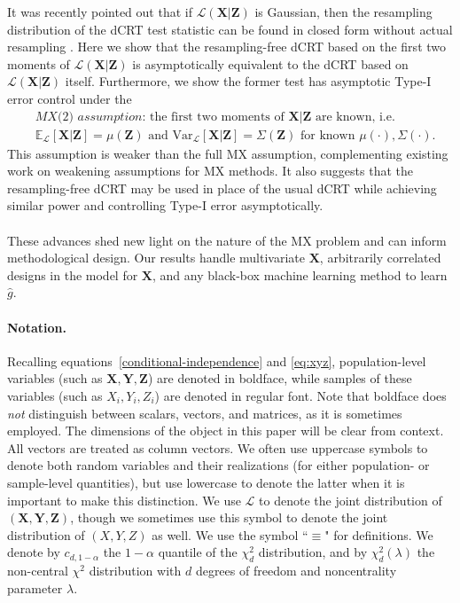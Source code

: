 \documentclass[ejs]{imsart}
\numberwithin{equation}{section}
\theoremstyle{plain}
\theoremstyle{definition}
\theoremstyle{remark}
\newcommand{\prx}{\bm X}
\newcommand{\srx}{X}
\newcommand{\prz}{\bm Z}
\newcommand{\srz}{Z}
\newcommand{\pry}{{\bm Y}}
\newcommand{\sry}{Y}
\begin{document}
It was recently pointed out that if $\mathcal L(\prx|\prz)$ is Gaussian, then the resampling distribution of the dCRT test statistic can be found in closed form without actual resampling \citep{Liu2020}. Here we show that the resampling-free dCRT based on the first two moments of $\mathcal L(\prx|\prz)$ is asymptotically equivalent to the dCRT based on $\mathcal L(\prx|\prz)$ itself. Furthermore, we show the former test has asymptotic Type-I error control under the
\begin{equation}
	\begin{split}
		&\textit{MX(2) assumption:} \text{ the first two moments of $\prx|\prz$ are known, i.e.} \\
		&\mathbb E_{\mathcal L}[\prx|\prz] = \mu(\prz) \text{ and } \text{Var}_{\mathcal L}[\prx|\prz] = \Sigma(\prz) \text{ for known } \mu(\cdot), \Sigma(\cdot).
		\label{MX(2)-intro}
	\end{split}
\end{equation}
This assumption is weaker than the full MX assumption, complementing existing work \citep{Huang2019, Barber2020} on weakening assumptions for MX methods. It also suggests that the resampling-free dCRT may be used in place of the usual dCRT while achieving similar power and controlling Type-I error asymptotically.

\paragraph*{}

These advances shed new light on the nature of the MX problem and can inform methodological design. Our results handle multivariate $\prx$, arbitrarily correlated designs in the model for $\prx$, and any black-box machine learning method to learn $\widehat g$. 
\paragraph{Notation.}

Recalling equations~\eqref{conditional-independence} and \eqref{eq:xyz}, population-level variables (such as $\prx,\pry,\prz$) are denoted in boldface, while samples of these variables (such as $\srx_i,\sry_i,\srz_i$) are denoted in regular font. Note that boldface does \textit{not} distinguish between scalars, vectors, and matrices, as it is sometimes employed. The dimensions of the object in this paper will be clear from context. All vectors are treated as column vectors. We often use uppercase symbols to denote both random variables and their realizations (for either population- or sample-level quantities), but use lowercase to denote the latter when it is important to make this distinction. We use $\mathcal L$ to denote the joint distribution of $(\prx,\pry,\prz)$, though we sometimes use this symbol to denote the joint distribution of $(\srx,\sry,\srz)$ as well. We use the symbol ``$\equiv$" for definitions. We denote by $c_{d,1-\alpha}$ the $1-\alpha$ quantile of the $\chi^2_d$ distribution, and by $\chi^2_d(\lambda)$ the non-central $\chi^2$ distribution with $d$ degrees of freedom and noncentrality parameter $\lambda$.
\end{document}
